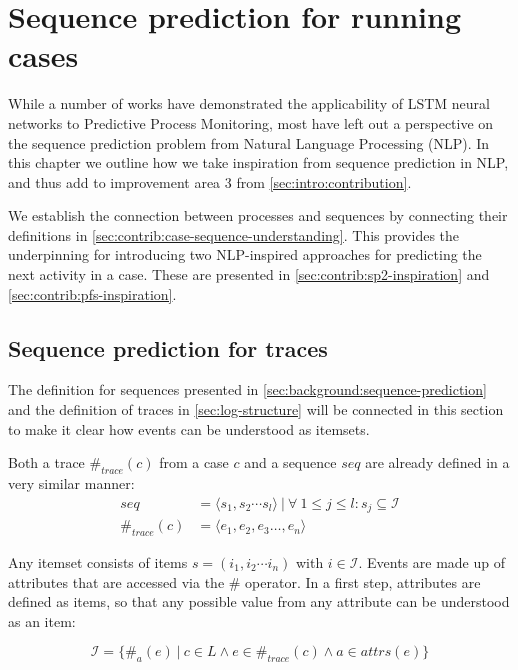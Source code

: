 \chapter{Sequence prediction for running cases}
\label{chap:taking-inspiration}
While a number of works have demonstrated the applicability of LSTM neural networks to Predictive Process Monitoring, most have left out a perspective on the sequence prediction problem from Natural Language Processing (NLP). In this chapter we outline how we take inspiration from sequence prediction in NLP, and thus add to improvement area 3 from \autoref{sec:intro:contribution}.

We establish the connection between processes and sequences by connecting their definitions in \autoref{sec:contrib:case-sequence-understanding}. This provides the underpinning for introducing two NLP-inspired approaches for predicting the next activity in a case. These are presented in \autoref{sec:contrib:sp2-inspiration} and \autoref{sec:contrib:pfs-inspiration}.

\section{Sequence prediction for traces}\label{sec:contrib:case-sequence-understanding}
The definition for sequences presented in \autoref{sec:background:sequence-prediction} and the definition of traces in \autoref{sec:log-structure} will be connected in this section to make it clear how events can be understood as itemsets.

Both a trace $\#_{trace}(c)$ from a case $c$ and a sequence $seq$ are already defined in a very similar manner:
\begin{equation*}
\begin{split}
seq           &=  \langle s_1,s_2\cdots s_l \rangle\ |\ \forall\ 1 \leq j \leq l: s_j \subseteq \mathscr{I}\\
\#_{trace}(c) &= \langle e_1, e_2, e_3 \dots, e_n \rangle
\end{split}
\end{equation*}

Any itemset consists of items $s = (i_1, i_2 \cdots i_n)$ with $i \in \mathscr{I}$. Events are made up of attributes that are accessed via the $\#$ operator.
In a first step, attributes are defined as items, so that any possible value from any attribute can be understood as an item:

$$\mathscr{I} = \{\#_{a}(e)\ |\ c \in L\wedge e \in \#_{trace}(c) \wedge a \in attrs(e)\}$$

